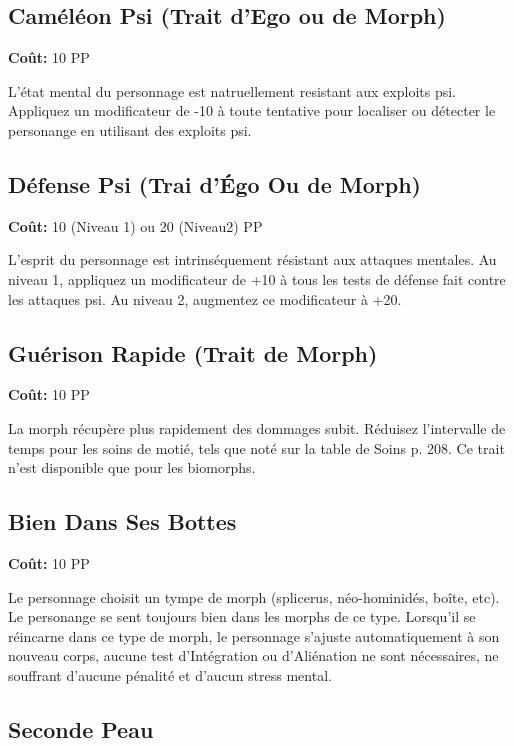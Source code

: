 \subsection{Caméléon Psi (Trait d'Ego ou de Morph)} \label{sec:traits-psi-chameleon} 

\textbf{Coût:} 10 PP 

L'état mental du personnage est natruellement resistant aux exploits psi. Appliquez un modificateur de -10 à toute tentative pour localiser ou détecter le personange en utilisant des exploits psi. 

\subsection{Défense Psi (Trai d'Égo Ou de Morph)} \label{sec:traits-psi-defense} 

\textbf{Coût:} 10 (Niveau 1) ou 20 (Niveau2) PP 

L'esprit du personnage est intrinséquement résistant aux attaques mentales. Au niveau 1, appliquez un modificateur de +10 à tous les tests de défense fait contre les attaques psi. Au niveau 2, augmentez ce modificateur à +20. 

\subsection{Guérison Rapide (Trait de Morph)} \label{sec:traits-rapid-healer} 

\textbf{Coût:} 10 PP 

La morph récupère plus rapidement des dommages subit. Réduisez l'intervalle de temps pour les soins de motié, tels que noté sur la table de Soins p. 208. Ce trait n'est disponible que pour les biomorphs. 

\subsection{Bien Dans Ses Bottes} \label{sec:traits-right-at-home} 

\textbf{Coût:} 10 PP 

Le personnage choisit un tympe de morph (splicerus, néo-hominidés, boîte, etc). Le personange se sent toujours bien dans les morphs de ce type. Lorsqu'il se réincarne dans ce type de morph, le personnage s'ajuste automatiquement à son nouveau corps, aucune test d'Intégration ou d'Aliénation ne sont nécessaires, ne souffrant d'aucune pénalité et d'aucun stress mental. 

\subsection{Seconde Peau} \label{sec:traits-secondskin} 


